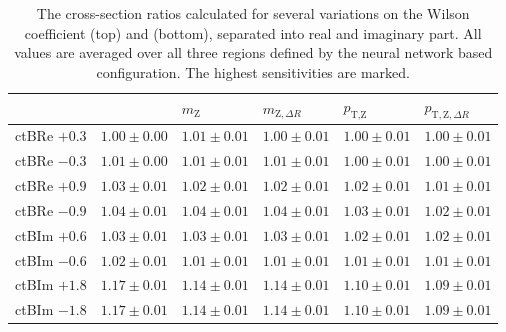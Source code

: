 \documentclass[bachelor,oneside, BCOR10mm,
			ngerman,english  %
]{GAUBM}
\begin{document}
\begin{table}
	\centering
	\caption{The cross-section ratios calculated for several variations on the Wilson coefficient \ctB (top) and \ctW (bottom), separated into real and imaginary part. All values are averaged over all three regions defined by the neural network based configuration. The highest sensitivities are marked.}
	\vspace{1mm}
	\label{tab:CrossSectionRatio}
	\begin{tabular}{R{23mm}|rrrrr}
		& 
		 & 
		 & 
		 & 
		 & 
		\\
		\hline
		ctBRe $+0.3$ 	& $1.00\pm0.00$ & $1.01\pm0.01$ & $1.00\pm0.01$ & $1.00\pm0.01$ & $1.00\pm0.01$ \\
		ctBRe $-0.3$ 	& $1.01\pm0.00$ & $1.01\pm0.01$ & $1.01\pm0.01$ & $1.00\pm0.01$ & $1.00\pm0.01$ \\
		ctBRe $+0.9$ 	& $1.03\pm0.01$ & $1.02\pm0.01$ & $1.02\pm0.01$ & $1.02\pm0.01$ & $1.01\pm0.01$ \\
		ctBRe $-0.9$ 	& $1.04\pm0.01$ & $1.04\pm0.01$ & $1.04\pm0.01$ & $1.03\pm0.01$ & $1.02\pm0.01$ \\
		\hline
		ctBIm $+0.6$ 	& $1.03\pm0.01$ & $1.03\pm0.01$ & $1.03\pm0.01$ & $1.02\pm0.01$ & $1.02\pm0.01$ \\
		ctBIm $-0.6$ 	& $1.02\pm0.01$ & $1.01\pm0.01$ & $1.01\pm0.01$ & $1.01\pm0.01$ & $1.01\pm0.01$ \\
		ctBIm $+1.8$ 	& $1.17\pm0.01$ & $1.14\pm0.01$ & $1.14\pm0.01$ & $1.10\pm0.01$ & $1.09\pm0.01$ \\
		ctBIm $-1.8$ 	& $1.17\pm0.01$ & $1.14\pm0.01$ & $1.14\pm0.01$ & $1.10\pm0.01$ & $1.09\pm0.01$ \\
	\end{tabular}
	
\vspace{3mm}


\end{table}
\end{document}
